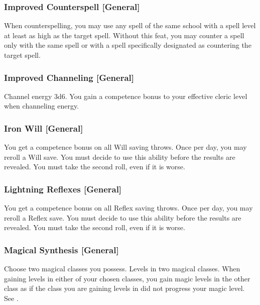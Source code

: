 
\subsubsection{Improved Counterspell [General]}
 When counterspelling, you may use any spell of the same school with a spell level at least as high as the target spell.
 Without this feat, you may counter a spell only with the same spell or with a spell specifically designated as countering the target spell.

\subsubsection{Improved Channeling [General]}
 Channel energy 3d6.
 You gain a  competence bonus to your effective cleric level when channeling energy.

\subsubsection{Iron Will [General]}
 You get a  competence bonus on all Will saving throws. Once per day, you may reroll a Will save. You must decide to use this ability before the results are revealed. You must take the second roll, even if it is worse.

\subsubsection{Lightning Reflexes [General]}
 You get a  competence bonus on all Reflex saving throws. Once per day, you may reroll a Reflex save. You must decide to use this ability before the results are revealed. You must take the second roll, even if it is worse.

\subsubsection{Magical Synthesis [General]}
Choose two magical classes you possess.
 Levels in two magical classes.
 When gaining levels in either of your chosen classes, you gain magic levels in the other class as if the class you are gaining levels in did not progress your magic level. See .

